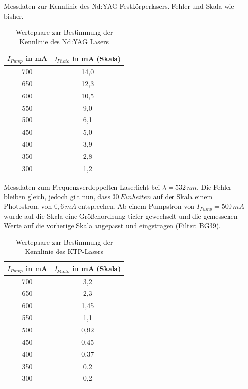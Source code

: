 \documentclass[twoside,colorback,accentcolor=tud4c,11pt]{tudreport}
\begin{document}
Messdaten zur Kennlinie des Nd:YAG Festkörperlasers. Fehler und Skala wie bisher.
\begin{table}[H]
\renewcommand*{\arraystretch}{1.2}
\centering
\begin{tabular}{|c|c|}
\hline 
$I_{Pump}$ in mA & $I_{Photo}$ in mA (Skala)\\
\hline 
700 & 14,0  \\ 
\hline 
650 & 12,3  \\ 
\hline 
600 & 10,5  \\ 
\hline 
550 & 9,0  \\ 
\hline 
500 & 6,1  \\ 
\hline
450 & 5,0 \\ 
\hline
400 & 3,9 \\ 
\hline
350 & 2,8 \\ 
\hline
300 & 1,2 \\ 
\hline
\end{tabular} 
\caption{Wertepaare zur Bestimmung der Kennlinie des Nd:YAG Lasers}\label{kennND}
\end{table}
\newpage
Messdaten zum Frequenzverdoppelten Laserlicht bei $\lambda =532\,\si{nm}$. Die Fehler bleiben gleich, jedoch gilt nun, dass $30\,\si{Einheiten}$ auf der Skala einem Photostrom von $0,6\,\si{mA}$ entsprechen.
Ab einem Pumpstron von $I_{Pump}=500\,\si{mA}$ wurde auf die Skala eine Größenordnung tiefer gewechselt und die gemessenen Werte auf die vorherige Skala angepasst und eingetragen (Filter: BG39).
\begin{table}[H]
\renewcommand*{\arraystretch}{1.2}
\centering
\begin{tabular}{|c|c|}
\hline 
$I_{Pump}$ in mA & $I_{Photo}$ in mA (Skala)\\
\hline 
700 & 3,2  \\ 
\hline 
650 & 2,3  \\ 
\hline 
600 & 1,45  \\ 
\hline 
550 & 1,1  \\ 
\hline 
500 & 0,92  \\ 
\hline
450 & 0,45 \\ 
\hline
400 & 0,37 \\ 
\hline
350 & 0,2 \\ 
\hline
300 & 0,2 \\ 
\hline
\end{tabular} 
\caption{Wertepaare zur Bestimmung der Kennlinie des KTP-Lasers}\label{kennktp}
\end{table}
\end{document}

